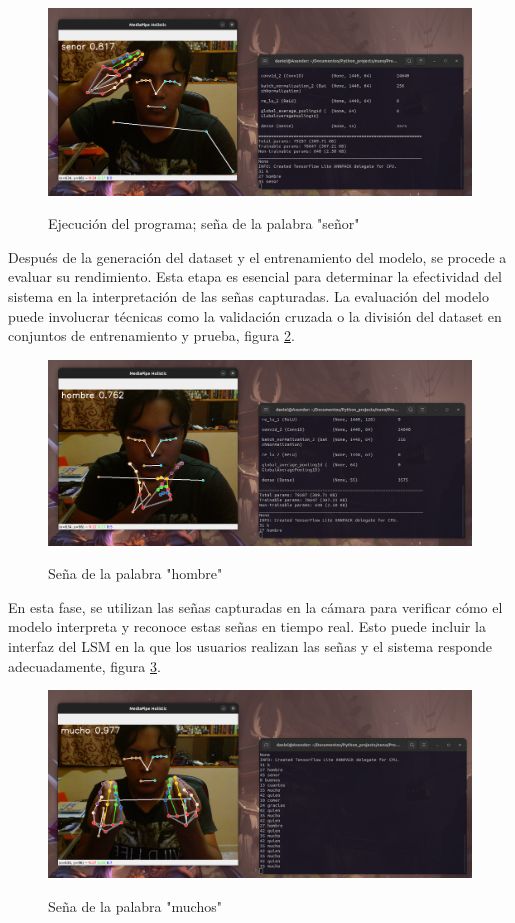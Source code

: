 \documentclass[conference]{IEEEtran}
\begin{document}
\begin{figure}[h]
\centering
{\includegraphics[width=0.95\linewidth]{img/01.png}}
\caption{Ejecución del programa; seña de la palabra "señor"}
\label{fig:1}
\end{figure}

Después de la generación del dataset y el entrenamiento del modelo, se procede a evaluar su rendimiento. Esta etapa es esencial para determinar la efectividad del sistema en la interpretación de las señas capturadas. La evaluación del modelo puede involucrar técnicas como la validación cruzada o la división del dataset en conjuntos de entrenamiento y prueba, figura  \ref{fig:2}.


\begin{figure}[h]
\centering
{\includegraphics[width=0.95\linewidth]{img/02.png}}
\caption{Seña de la palabra "hombre"}
\label{fig:2}
\end{figure}

En esta fase, se utilizan las señas capturadas en la cámara para verificar cómo el modelo interpreta y reconoce estas señas en tiempo real. Esto puede incluir la interfaz del LSM en la que los usuarios realizan las señas y el sistema responde adecuadamente, figura \ref{fig:3}.



\begin{figure}[h]
\centering
{\includegraphics[width=0.95\linewidth]{img/03.png}}
\caption{Seña de la palabra "muchos"}
\label{fig:3}
\end{figure}
\end{document}
